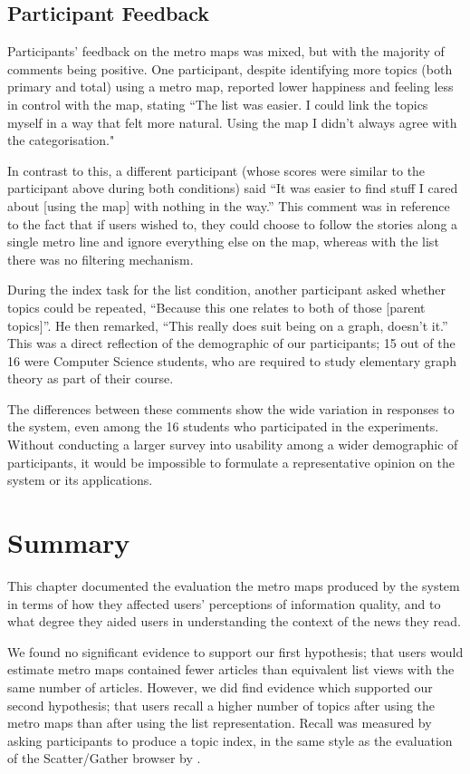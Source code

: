 \subsection{Participant Feedback}

Participants' feedback on the metro maps was mixed, but with the majority of comments being positive. One participant, despite identifying more topics (both primary and total) using a metro map, reported lower happiness and feeling less in control with the map, stating ``The list was easier. I could link the topics myself in a way that felt more natural. Using the map I didn't always agree with the categorisation."

In contrast to this, a different participant (whose scores were similar to the participant above during both conditions) said ``It was easier to find stuff I cared about [using the map] with nothing in the way.'' This comment was in reference to the fact that if users wished to, they could choose to follow the stories along a single metro line and ignore everything else on the map, whereas with the list there was no filtering mechanism.

During the index task for the list condition, another participant asked whether topics could be repeated, ``Because this one relates to both of those [parent topics]''. He then remarked, ``This really does suit being on a graph, doesn't it.'' This was a direct reflection of the demographic of our participants; 15 out of the 16 were Computer Science students, who are required to study elementary graph theory as part of their course.

The differences between these comments show the wide variation in responses to the system, even among the 16 students who participated in the experiments. Without conducting a larger survey into usability among a wider demographic of participants, it would be impossible to formulate a representative opinion on the system or its applications.

\section{Summary}

This chapter documented the evaluation the metro maps produced by the system in terms of how they affected users' perceptions of information quality, and to what degree they aided users in understanding the context of the news they read.

We found no significant evidence to support our first hypothesis; that users would estimate metro maps contained fewer articles than equivalent list views with the same number of articles. However, we did find evidence which supported our second hypothesis; that users recall a higher number of topics after using the metro maps than after using the list representation. Recall was measured by asking participants to produce a topic index, in the same style as the evaluation of the Scatter/Gather browser by \cite{scattergather}.

